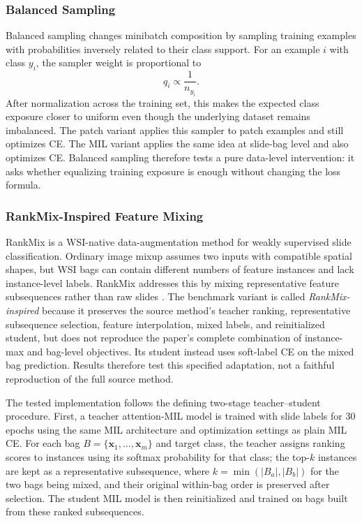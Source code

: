 \documentclass[11pt]{article}
\begin{document}
\subsubsection{Balanced Sampling}
Balanced sampling changes minibatch composition by sampling training examples with probabilities inversely related to their class support. For an example $i$ with class $y_i$, the sampler weight is proportional to
\begin{equation}
  q_i \propto \frac{1}{n_{y_i}}.
  \label{eq:balanced-sampling}
\end{equation}
After normalization across the training set, this makes the expected class exposure closer to uniform even though the underlying dataset remains imbalanced. The patch variant applies this sampler to patch examples and still optimizes CE. The MIL variant applies the same idea at slide-bag level and also optimizes CE. Balanced sampling therefore tests a pure data-level intervention: it asks whether equalizing training exposure is enough without changing the loss formula.

\subsubsection{RankMix-Inspired Feature Mixing}
RankMix is a WSI-native data-augmentation method for weakly supervised slide classification. Ordinary image mixup assumes two inputs with compatible spatial shapes, but WSI bags can contain different numbers of feature instances and lack instance-level labels. RankMix addresses this by mixing representative feature subsequences rather than raw slides \citep{chen2023rankmix}. The benchmark variant is called \emph{RankMix-inspired} because it preserves the source method's teacher ranking, representative subsequence selection, feature interpolation, mixed labels, and reinitialized student, but does not reproduce the paper's complete combination of instance-max and bag-level objectives. Its student instead uses soft-label CE on the mixed bag prediction. Results therefore test this specified adaptation, not a faithful reproduction of the full source method.

The tested implementation follows the defining two-stage teacher--student procedure. First, a teacher attention-MIL model is trained with slide labels for 30 epochs using the same MIL architecture and optimization settings as plain MIL CE. For each bag $B=\{\mathbf{x}_1,\ldots,\mathbf{x}_m\}$ and target class, the teacher assigns ranking scores to instances using its softmax probability for that class; the top-$k$ instances are kept as a representative subsequence, where $k=\min(|B_a|,|B_b|)$ for the two bags being mixed, and their original within-bag order is preserved after selection. The student MIL model is then reinitialized and trained on bags built from these ranked subsequences.
\end{document}
